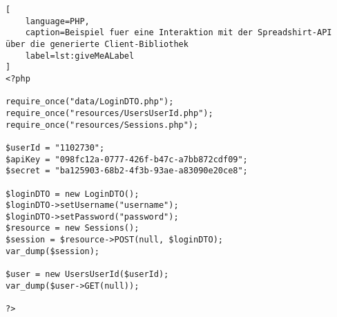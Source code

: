 \begin{lstlisting}[
    language=PHP,
    caption=Beispiel fuer eine Interaktion mit der Spreadshirt-API über die generierte Client-Bibliothek
    label=lst:giveMeALabel
]
<?php

require_once("data/LoginDTO.php");
require_once("resources/UsersUserId.php");
require_once("resources/Sessions.php");

$userId = "1102730";
$apiKey = "098fc12a-0777-426f-b47c-a7bb872cdf09";
$secret = "ba125903-68b2-4f3b-93ae-a83090e20ce8";

$loginDTO = new LoginDTO();
$loginDTO->setUsername("username");
$loginDTO->setPassword("password");
$resource = new Sessions();
$session = $resource->POST(null, $loginDTO);
var_dump($session);

$user = new UsersUserId($userId);
var_dump($user->GET(null));

?>
\end{lstlisting}

